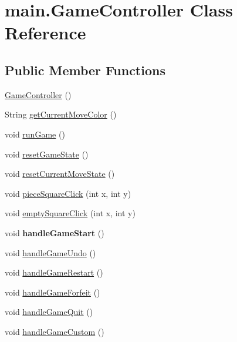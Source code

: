 \hypertarget{classmain_1_1_game_controller}{}\section{main.\+Game\+Controller Class Reference}
\label{classmain_1_1_game_controller}
\subsection*{Public Member Functions}
\begin{DoxyCompactItemize}
\item 
\hyperlink{classmain_1_1_game_controller_a455fa762af5d53a326a0c586fe4dcfe4}{Game\+Controller} ()
\item 
String \hyperlink{classmain_1_1_game_controller_acd8e5da713b1029f841ddd7fe9b54d0d}{get\+Current\+Move\+Color} ()
\item 
void \hyperlink{classmain_1_1_game_controller_a988e49925efe78aff8e776af38964b7b}{run\+Game} ()
\item 
void \hyperlink{classmain_1_1_game_controller_aa8c33e3c78ef79c96207ee507fe4f29b}{reset\+Game\+State} ()
\item 
void \hyperlink{classmain_1_1_game_controller_a810118fdb7712c718031ecc6464f3123}{reset\+Current\+Move\+State} ()
\item 
void \hyperlink{classmain_1_1_game_controller_a46df83552d6ea7c824e3eb13dc95d6c4}{piece\+Square\+Click} (int x, int y)
\item 
void \hyperlink{classmain_1_1_game_controller_a469b3da25d6a5ee02984379328262965}{empty\+Square\+Click} (int x, int y)
\item 
\hypertarget{classmain_1_1_game_controller_a88954a71a73f53a1c0be604dc99d235f}{}\label{classmain_1_1_game_controller_a88954a71a73f53a1c0be604dc99d235f} 
void {\bfseries handle\+Game\+Start} ()
\item 
void \hyperlink{classmain_1_1_game_controller_ac965ec2ce1c31547f9d219acca840629}{handle\+Game\+Undo} ()
\item 
void \hyperlink{classmain_1_1_game_controller_a328600841ad583141ff90225ef520d82}{handle\+Game\+Restart} ()
\item 
void \hyperlink{classmain_1_1_game_controller_a864236ccf74601951d818826253123d4}{handle\+Game\+Forfeit} ()
\item 
void \hyperlink{classmain_1_1_game_controller_a8291acf4ec3e1dc1cabdcb2a23c70e16}{handle\+Game\+Quit} ()
\item 
void \hyperlink{classmain_1_1_game_controller_ae75c41f7d73fe335be348d54a8e8c4e6}{handle\+Game\+Custom} ()
\end{DoxyCompactItemize}
